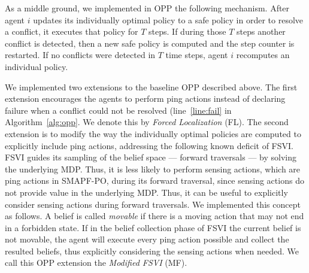 \documentclass[letterpaper]{article} %
\begin{document}
 As a middle ground, we implemented in OPP the following mechanism. After agent $i$ updates its individually optimal policy to a safe policy in order to resolve a conflict, it executes that policy for $T$ steps. If during those $T$ steps another conflict is detected, then a new safe policy is computed and the step counter is restarted. If no conflicts were detected in $T$ time steps, agent $i$ recomputes an individual  policy.



We implemented two extensions to the baseline OPP described above. 
The first extension encourages the agents to perform ping actions instead of declaring failure when a conflict could not be resolved (line~\ref{line:fail} in Algorithm~\ref{alg:opp}. We denote this by \emph{Forced Localization} (FL). 
The second extension is to modify the way the individually optimal policies are computed to explicitly include ping actions, addressing the following known deficit of FSVI. 
FSVI guides its sampling of the belief space --- forward traversals --- by solving the underlying MDP. 
Thus, it is less likely to perform sensing actions, which are ping actions in SMAPF-PO, during its forward traversal, since sensing actions do not provide value in the underlying MDP. 
Thus, it can be useful to explicitly consider sensing actions during forward traversals.
We implemented this concept as follows. 
A belief is called \emph{movable} if there is a moving action that may not end in a forbidden state. 
If in the belief collection phase of FSVI the current belief is not movable, the agent will execute every ping action possible and collect the resulted beliefs, thus explicitly considering the sensing actions when needed.
We call this OPP extension the \emph{Modified FSVI} (MF). 
\end{document}
